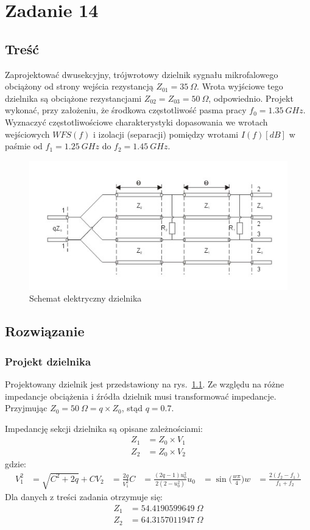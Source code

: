 \documentclass[rep.tex]{subfiles}
\begin{document}
\chapter{Zadanie 14}
\label{zad14}
\section{Treść}
Zaprojektować dwusekcyjny, trójwrotowy dzielnik sygnału mikrofalowego obciążony od strony wejścia rezystancją $Z_{01} = 35~\Omega$.
Wrota wyjściowe tego dzielnika są obciążone rezystancjami $Z_{02} = Z_{03} = 50~\Omega$, odpowiednio.
Projekt wykonać, przy założeniu, że środkowa częstotliwość pasma pracy $f_0 = 1.35~GHz$.
Wyznaczyć częstotliwościowe charakterystyki dopasowania we wrotach wejściowych $WFS(f)$ i izolacji (separacji) pomiędzy wrotami $I(f)[dB]$ w paśmie od $f_1 = 1.25~GHz$ do $f_2 = 1.45~GHz$.

\begin{figure}[!htbp]
  \centering
  \includegraphics[width=0.5\linewidth]{fig/zad14/div}
  \caption{Schemat elektryczny dzielnika}
  \label{fig:zad14:div}
\end{figure}

\section{Rozwiązanie}
\subsection{Projekt dzielnika}
Projektowany dzielnik jest przedstawiony na rys.~\ref{fig:zad14:div}.
Ze względu na różne impedancje obciążenia i źródła dzielnik musi transformować impedancje.
Przyjmując $Z_0 = 50~\Omega = q \times Z_0$, stąd $q = 0.7$.

Impedancję sekcji dzielnika są opisane zależnościami:
\begin{align}
  Z_1 &= Z_0 \times V_1 \\
  Z_2 &= Z_0 \times V_2
\end{align}
gdzie:
\begin{align}
  V_1^2 &= \sqrt{C^2 + 2q} + C
  V_2   &= \frac{2q}{V_1^2}
  C     &= \frac{(2q - 1) u_0^2}{2(2 - u_0^2)}
  u_0   &= \sin\Big(\frac{w \pi}{4}\Big)
  w     &= \frac{2(f_2 - f_1)}{f_1 + f_2}
\end{align}
Dla danych z treści zadania otrzymuje się:
\begin{align}
  Z_1 &= 54.4190599649~\Omega \nonumber \\
  Z_2 &= 64.3157011947~\Omega \nonumber
\end{align}
\end{document}
